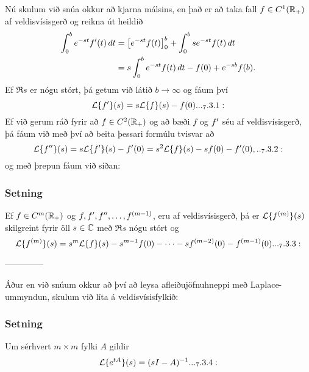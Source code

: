\noindent
Nú skulum við snúa okkur að kjarna málsins, en það er að 
taka  fall $f\in C\sp
1({\mathbb R}_+)$ af veldisvísisgerð og reikna út heildið
\begin{align*}
\int_0\sp b e\sp{-st}f{\sp{\prime}}(t)\, dt &=
\left[e\sp{-st}f(t)\right]_0\sp b+
\int_0\sp b se\sp{-st}f(t)\, dt \\
&=
s\int_0\sp b e\sp{-st}f(t)\, dt -f(0)+e\sp{-sb}f(b).
\end{align*}
Ef $\Re s$ er nógu stórt, þá getum við látið $b\to \infty$ og fáum því
 \begin{equation*}\L\{f\dash\}(s)=s\L\{f\}(s)-f(0).


.. _7.3.1:

 \end{equation*}
Ef við gerum ráð fyrir að $f\in C^2({\mathbb R}_+)$ og að bæði $f$ og $f{\sp{\prime}}$
séu af veldisvísisgerð, þá fáum við með því að
beita þessari formúlu tvisvar  að 
 \begin{equation*}\L\{f\ddash\}(s)=s\L\{f\dash\}(s)-f\dash(0)=s\sp 2\L\{f\}(s)
-sf(0)-f\dash(0),


.. _7.3.2:

 \end{equation*}
og með þrepun fáum við síðan:

\subsubsection{Setning} 
Ef $f\in C\sp m({\mathbb R}_+)$ og  $f, f{\sp{\prime}}, f{\sp{\prime\prime}},
\dots, f\sp{(m-1)}$,  eru af veldisvísisgerð, þá er ${\cal L}\{f\sp{(m)}\}(s)$
skilgreint fyrir öll $s\in {\mathbb C}$ með  $\Re s$ nógu stórt og
 \begin{equation*}\L\{f\sp{(m)}\}(s)=s\sp
m\L\{f\}(s)-s\sp{m-1}f(0)-\cdots-sf\sp{(m-2)}(0)-f\sp{(m-1)}(0).

.. _7.3.3:

 \end{equation*}


--------------





Áður en við snúum okkur að því að leysa afleiðujöfnuhneppi með
Laplace-ummyndun, skulum við líta á veldisvísisfylkið:


\subsubsection{Setning} 
Um sérhvert $m\times m$ fylki  $A$ gildir
\begin{equation*}
\L\{e^{tA}\}(s) = (sI-A)^{-1}.


.. _7.3.4:

\end{equation*}


